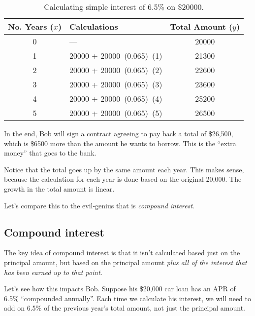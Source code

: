 
\begin{table}[!htbp]
\centering
\begin{tabular}{clc}
No. Years ($x$) & Calculations & Total Amount ($y$)\\\hline
0 & --- & 20000\\
1 & 20000 + 20000~(0.065)~(1) & 21300\\
2 & 20000 + 20000~(0.065)~(2) & 22600\\
3 & 20000 + 20000~(0.065)~(3) & 23600\\
4 & 20000 + 20000~(0.065)~(4) & 25200\\
5 & 20000 + 20000~(0.065)~(5) & 26500\\
\end{tabular}
\caption{Calculating simple interest of 6.5\% on \$20000.}
\label{table:bobsimple}
\end{table}

In the end, Bob will sign a contract agreeing to pay back a total of \$26,500, which is \$6500 more than the amount he wants to borrow. This is the ``extra money'' that goes to the bank.

Notice that the total goes up by the same amount each year. This makes sense, because the calculation for each year is done based on the original 20,000. The growth in the total amount is linear.

Let's compare this to the evil-genius that is \textit{compound interest}.


\subsection{Compound interest}

The key idea of compound interest is that it isn't calculated based just on the principal amount, but based on the principal amount \textit{plus all of the interest that has been earned up to that point}.

Let's see how this impacts Bob. Suppose his \$20,000 car loan has an APR of 6.5\% ``compounded annually''. Each time we calculate his interest, we will need to add on 6.5\% of the previous year's total amount, not just the principal amount.

